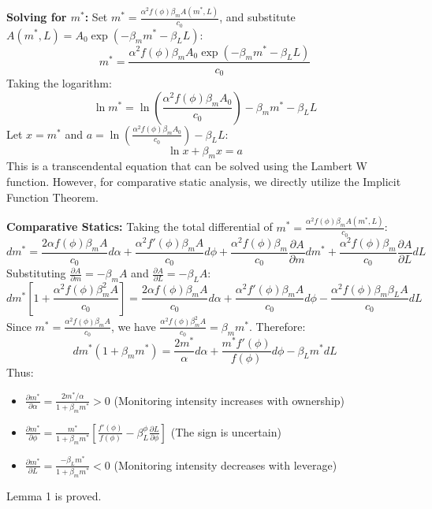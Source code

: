 \documentclass[12pt,a4paper]{article}
\begin{document}
\textbf{Solving for $m^*$:}
Set $m^* = \frac{\alpha^2 f(\phi) \beta_m A(m^*, L)}{c_0}$, and substitute $A(m^*, L) = A_0 \exp(-\beta_m m^* - \beta_L L)$:
\begin{equation}
m^* = \frac{\alpha^2 f(\phi) \beta_m A_0 \exp(-\beta_m m^* - \beta_L L)}{c_0}
\end{equation}
Taking the logarithm:
\begin{equation}
\ln m^* = \ln \left( \frac{\alpha^2 f(\phi) \beta_m A_0}{c_0} \right) - \beta_m m^* - \beta_L L
\end{equation}
Let $x = m^*$ and $a = \ln \left( \frac{\alpha^2 f(\phi) \beta_m A_0}{c_0} \right) - \beta_L L$:
\begin{equation}
\ln x + \beta_m x = a
\end{equation}
This is a transcendental equation that can be solved using the Lambert W function. However, for comparative static analysis, we directly utilize the Implicit Function Theorem.

\textbf{Comparative Statics:}
Taking the total differential of $m^* = \frac{\alpha^2 f(\phi) \beta_m A(m^*, L)}{c_0}$:
\begin{equation}
dm^* = \frac{2 \alpha f(\phi) \beta_m A}{c_0} d\alpha + \frac{\alpha^2 f'(\phi) \beta_m A}{c_0} d\phi + \frac{\alpha^2 f(\phi) \beta_m}{c_0} \frac{\partial A}{\partial m} dm^* + \frac{\alpha^2 f(\phi) \beta_m}{c_0} \frac{\partial A}{\partial L} dL
\end{equation}
Substituting $\frac{\partial A}{\partial m} = -\beta_m A$ and $\frac{\partial A}{\partial L} = -\beta_L A$:
\begin{equation}
dm^* \left[1 + \frac{\alpha^2 f(\phi) \beta_m^2 A}{c_0}\right] = \frac{2 \alpha f(\phi) \beta_m A}{c_0} d\alpha + \frac{\alpha^2 f'(\phi) \beta_m A}{c_0} d\phi - \frac{\alpha^2 f(\phi) \beta_m \beta_L A}{c_0} dL
\end{equation}
Since $m^* = \frac{\alpha^2 f(\phi) \beta_m A}{c_0}$, we have $\frac{\alpha^2 f(\phi) \beta_m^2 A}{c_0} = \beta_m m^*$. Therefore:
\begin{equation}
dm^* (1 + \beta_m m^*) = \frac{2 m^*}{\alpha} d\alpha + \frac{m^* f'(\phi)}{f(\phi)} d\phi - \beta_L m^* dL
\end{equation}
Thus:
\begin{itemize}
    \item $\frac{\partial m^*}{\partial \alpha} = \frac{2 m^* / \alpha}{1 + \beta_m m^*} > 0$ (Monitoring intensity increases with ownership)
    \item $\frac{\partial m^*}{\partial \phi} = \frac{m^*}{1 + \beta_m m^*} \left[ \frac{f'(\phi)}{f(\phi)} - \beta_L^\phi \frac{\partial L}{\partial \phi} \right]$ (The sign is uncertain)
    \item $\frac{\partial m^*}{\partial L} = \frac{-\beta_L m^*}{1 + \beta_m m^*} < 0$ (Monitoring intensity decreases with leverage)
\end{itemize}
Lemma 1 is proved. 
\end{document}
